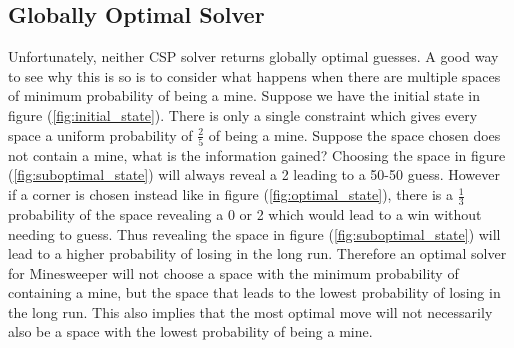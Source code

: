 \documentclass[letterpaper]{article}
\begin{document}
\subsection{Globally Optimal Solver}
Unfortunately, neither CSP solver returns globally optimal guesses.  A good way to see why this is so is to consider what happens when there are multiple spaces of minimum probability of being a mine.  Suppose we have the initial state in figure (\ref{fig:initial_state}).  There is only a single constraint which gives every space a uniform probability of $\frac25$ of being a mine.  Suppose the space chosen does not contain a mine, what is the information gained?  Choosing the space in figure (\ref{fig:suboptimal_state}) will always reveal a 2 leading to a 50-50 guess.  However if a corner is chosen instead like in figure (\ref{fig:optimal_state}), there is a $\frac13$ probability of the space revealing a 0 or 2 which would lead to a win without needing to guess.  Thus revealing the space in figure (\ref{fig:suboptimal_state}) will lead to a higher probability of losing in the long run.  Therefore an optimal solver for Minesweeper will not choose a space with the minimum probability of containing a mine, but the space that leads to the lowest probability of losing in the long run.  This also implies that the most optimal move will not necessarily also be a space with the lowest probability of being a mine.
\end{document}
